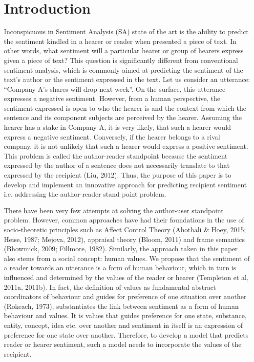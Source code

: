 
\section{Introduction}

Inconspicuous in Sentiment Analysis (SA) state of the art is the ability to predict the sentiment kindled in a hearer or reader when presented a piece of text. In other words, what sentiment will a particular hearer or group of hearers express given a piece of text? This question is significantly different from conventional sentiment analysis, which is commonly aimed at predicting the sentiment of the text's author or the sentiment expressed in the text. Let us consider an utterance: ``Company A's shares will drop next week''. On the surface, this utterance expresses a negative sentiment. However, from a human perspective, the sentiment expressed is open to who the hearer is and the context from which the sentence and its component subjects are perceived by the hearer. Assuming the hearer has a stake in Company A, it is very likely, that such a hearer would express a negative sentiment. Conversely, if the hearer belongs to a rival company, it is not unlikely that such a hearer would express a positive sentiment. This problem is called the author-reader standpoint because the sentiment expressed by the author of a sentence does not necessarily translate to that expressed by the recipient (Liu, 2012). Thus, the purpose of this paper is to develop and implement an innovative approach for predicting recipient sentiment i.e. addressing the author-reader stand point problem.


There have been very few attempts at solving the author-user standpoint problem. However, common approaches have had their foundations in the use of socio-theoretic principles such as Affect Control Theory (Ahothali \& Hoey, 2015; Heise, 1987; Mejova, 2012), appraisal theory (Bloom, 2011) and frame semantics (Bhowmick, 2009; Fillmore, 1982). Similarly, the approach taken in this paper also stems from a social concept: human values. We propose that the sentiment of a reader towards an utterance is a form of human behaviour, which in turn is influenced and determined by the values of the reader or hearer (Templeton et al, 2011a, 2011b). In fact, the definition of values as fundamental abstract coordinators of behaviour and guides for preference of one situation over another (Rokeach, 1973), substantiates the link between sentiment as a form of human behaviour and values. It is values that guides preference for one state, substance, entity, concept, idea etc. over another and sentiment in itself is an expression of preference for one state over another. Therefore, to develop a model that predicts reader or hearer sentiment, such a model needs to incorporate the values of the recipient. 


